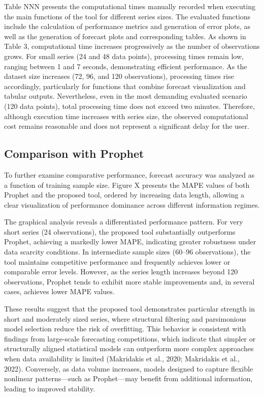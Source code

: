 \documentclass[journal,article,submit,pdftex,moreauthors]{Definitions/mdpi}
\begin{document}
Table NNN presents the computational times manually recorded when executing the main functions of the tool for different series sizes. The evaluated functions include the calculation of performance metrics and generation of error plots, as well as the generation of forecast plots and corresponding tables.
As shown in Table 3, computational time increases progressively as the number of observations grows. For small series (24 and 48 data points), processing times remain low, ranging between 1 and 7 seconds, demonstrating efficient performance.
As the dataset size increases (72, 96, and 120 observations), processing times rise accordingly, particularly for functions that combine forecast visualization and tabular outputs. Nevertheless, even in the most demanding evaluated scenario (120 data points), total processing time does not exceed two minutes.
Therefore, although execution time increases with series size, the observed computational cost remains reasonable and does not represent a significant delay for the user.

\subsection{Comparison with Prophet}
To further examine comparative performance, forecast accuracy was analyzed as a function of training sample size. Figure X presents the MAPE values of both Prophet and the proposed tool, ordered by increasing data length, allowing a clear visualization of performance dominance across different information regimes.

The graphical analysis reveals a differentiated performance pattern. For very short series (24 observations), the proposed tool substantially outperforms Prophet, achieving a markedly lower MAPE, indicating greater robustness under data scarcity conditions. In intermediate sample sizes (60–96 observations), the tool maintains competitive performance and frequently achieves lower or comparable error levels. However, as the series length increases beyond 120 observations, Prophet tends to exhibit more stable improvements and, in several cases, achieves lower MAPE values.

These results suggest that the proposed tool demonstrates particular strength in short and moderately sized series, where structural filtering and parsimonious model selection reduce the risk of overfitting. This behavior is consistent with findings from large-scale forecasting competitions, which indicate that simpler or structurally aligned statistical models can outperform more complex approaches when data availability is limited (Makridakis et al., 2020; Makridakis et al., 2022). Conversely, as data volume increases, models designed to capture flexible nonlinear patterns—such as Prophet—may benefit from additional information, leading to improved stability.
\end{document}
